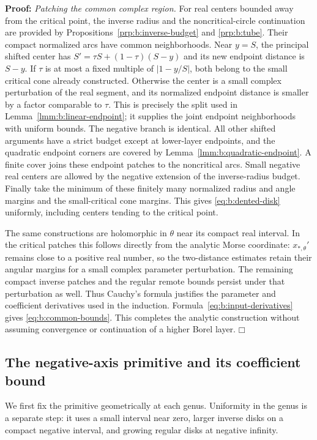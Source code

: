 \documentclass[a4paper,10pt]{article}
\numberwithin{equation}{section}
\theoremstyle{paperplain}
\theoremstyle{paperremark}
\theoremstyle{paperplain}
\newenvironment{prf}{\noindent \textbf{Proof: }}{\hfill $\mdlgwhtsquare$\par\addvspace{0.5\baselineskip}}
\begin{document}
\begin{prf}
\smallskip\noindent
\emph{Patching the common complex region.}
For real centers bounded away from the critical point, the inverse
radius and the noncritical-circle continuation are provided by
Propositions~\ref{prp:b:inverse-budget} and \ref{prp:b:tube}.
Their compact normalized arcs have common neighborhoods.
Near $y=S$, the principal shifted center has
$S'=\tau S+(1-\tau)(S-y)$ and its new endpoint distance is
$S-y$. If $\tau$ is at most a fixed multiple of $|1-y/S|$,
both belong to the small critical cone already constructed.
Otherwise the center is a small complex perturbation of the real
segment, and its normalized endpoint distance is smaller by a
factor comparable to $\tau$. This is precisely the split used in
Lemma~\ref{lmm:b:linear-endpoint}; it supplies the joint endpoint
neighborhoods with uniform bounds. The negative branch is identical.
All other shifted arguments have a strict budget except at lower-layer
endpoints, and the quadratic endpoint corners are covered by
Lemma~\ref{lmm:b:quadratic-endpoint}. A finite cover joins these
endpoint patches to the noncritical arcs. Small negative real centers
are allowed by the negative extension of the inverse-radius budget.
Finally take the minimum of these finitely many normalized radius
and angle margins and the small-critical cone margins.
This gives \eqref{eq:b:dented-disk} uniformly, including centers
tending to the critical point.

The same constructions are holomorphic in $\theta$ near its compact
real interval. In the critical patches this follows directly from
the analytic Morse coordinate: $x_{*,\theta}'$ remains close to a
positive real number, so the two-distance estimates retain their
angular margins for a small complex parameter perturbation. The
remaining compact inverse patches and the regular remote bounds
persist under that perturbation as well. Thus Cauchy's formula
justifies the parameter and coefficient derivatives used in the
induction. Formula~\eqref{eq:b:input-derivatives} gives
\eqref{eq:b:common-bounds}. This completes the analytic construction
without assuming convergence or continuation of a higher Borel layer.
\end{prf}

\subsection{The negative-axis primitive and its coefficient bound}
\label{subsec:b:primitives}

We first fix the primitive geometrically at each genus. Uniformity
in the genus is a separate step: it uses a small interval near zero,
larger inverse disks on a compact negative interval, and growing
regular disks at negative infinity.
\end{document}
